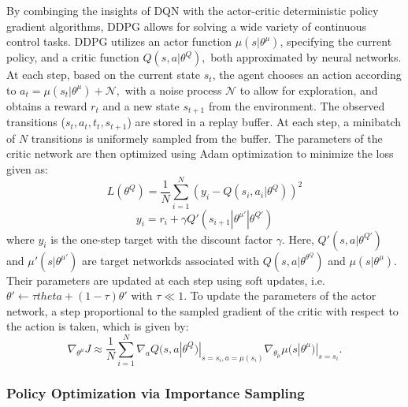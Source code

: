 By combinging the insights of DQN with the actor-critic deterministic policy gradient algorithms, DDPG allows for solving a wide variety of continuous control tasks. DDPG utilizes an actor function $\mu(s|\theta^\mu)$, specifying the current policy, and a critic function $Q(s,a|\theta^Q),$ both approximated by neural networks. At each step, based on the current state $s_t$, the agent chooses an action according to $a_t=\mu(s_t|\theta^\mu) + \mathcal{N},$ with a noise process $\mathcal{N}$ to allow for exploration, and obtains a reward $r_t$ and a new state $s_{t+1}$ from the environment. The observed transitions ($s_t,a_t,t_t,s_{t+1}$) are stored in a replay buffer. At each step, a minibatch of $N$ transitions is uniformely sampled from the buffer. The parameters of the critic network are then optimized using Adam optimization to minimize the loss given as: \[L(\theta^Q) = \frac{1}{N}\sum^N_{i=1}(y_i-Q(s_i,a_i|\theta^Q))^2\]
\[y_i=r_i+\gamma Q'(s_{i+1}|\theta^{\mu'}|\theta^{Q'})\]
where $y_i$ is the one-step target with the discount factor $\gamma$. Here, $Q'(s,a|\theta^{Q'})$ and $\mu'(s|\theta^{\mu'})$ are target networkds associated with $Q(s,a|\theta^{\theta^Q})$ and $\mu(s|\theta^\mu).$ Their parameters are updated at each step using soft updates, i.e. \(\theta' \leftarrow \tau theta + (1-\tau)\theta'\) with $\tau \ll 1.$ To update the parameters of the actor network, a step proportional to the sampled gradient of the critic with respect to the action is taken, which is given by: \[\nabla_{\theta^\mu}J\approx\frac{1}{N}\sum^N_{i=1}\nabla_aQ(s,a|\theta^Q)|_{s=s_i,a=\mu(s_i)}\nabla_{\theta_\mu}\mu(s|\theta^\mu)|_{s=s_i}.\]

\subsubsection{Policy Optimization via Importance Sampling}

